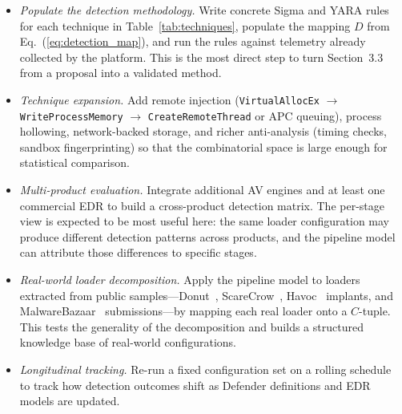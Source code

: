 \begin{itemize}[leftmargin=*, itemsep=2pt]
    \item \textit{Populate the detection methodology.}
    Write concrete Sigma and YARA rules for each technique in Table~\ref{tab:techniques}, populate the mapping $D$ from Eq.~(\ref{eq:detection_map}), and run the rules against telemetry already collected by the platform.
    This is the most direct step to turn Section~3.3 from a proposal into a validated method.

    \item \textit{Technique expansion.}
    Add remote injection (\texttt{VirtualAllocEx} $\rightarrow$ \texttt{WriteProcessMemory} $\rightarrow$ \texttt{CreateRemoteThread} or APC queuing), process hollowing, network-backed storage, and richer anti-analysis (timing checks, sandbox fingerprinting) so that the combinatorial space is large enough for statistical comparison.

    \item \textit{Multi-product evaluation.}
    Integrate additional AV engines and at least one commercial EDR to build a cross-product detection matrix.
    The per-stage view is expected to be most useful here: the same loader configuration may produce different detection patterns across products, and the pipeline model can attribute those differences to specific stages.

    \item \textit{Real-world loader decomposition.}
    Apply the pipeline model to loaders extracted from public samples---Donut~\cite{donut}, ScareCrow~\cite{scarecrow}, Havoc~\cite{havoc} implants, and MalwareBazaar~\cite{malwarebazaar} submissions---by mapping each real loader onto a $C$-tuple.
    This tests the generality of the decomposition and builds a structured knowledge base of real-world configurations.

    \item \textit{Longitudinal tracking.}
    Re-run a fixed configuration set on a rolling schedule to track how detection outcomes shift as Defender definitions and EDR models are updated.
\end{itemize}
